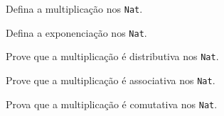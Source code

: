 \begin{exercise}
  Defina a multiplica\c c\~ao nos \texttt{Nat}.
\end{exercise}

\begin{exercise}
  Defina a exponencia\c c\~ao nos \texttt{Nat}.
\end{exercise}

\begin{exercise}
  Prove que a multiplica\c c\~ao \'e distributiva nos \texttt{Nat}.
\end{exercise}

\begin{exercise}
  Prove que a multiplica\c c\~ao \'e associativa nos \texttt{Nat}.
\end{exercise}

\begin{homework}
  Prova que a multiplica\c c\~ao \'e comutativa nos \texttt{Nat}.
\end{homework}
